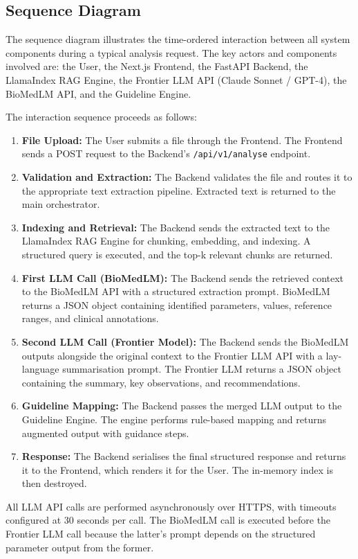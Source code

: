 \subsection{Sequence Diagram}
The sequence diagram illustrates the time-ordered interaction between all system components during a typical analysis request. The key actors and components involved are: the User, the Next.js Frontend, the FastAPI Backend, the LlamaIndex RAG Engine, the Frontier LLM API (Claude Sonnet / GPT-4), the BioMedLM API, and the Guideline Engine.

The interaction sequence proceeds as follows:

\begin{enumerate}
    \item \textbf{File Upload:} The User submits a file through the Frontend. The Frontend sends a POST request to the Backend's \texttt{/api/v1/analyse} endpoint.
    \item \textbf{Validation and Extraction:} The Backend validates the file and routes it to the appropriate text extraction pipeline. Extracted text is returned to the main orchestrator.
    \item \textbf{Indexing and Retrieval:} The Backend sends the extracted text to the LlamaIndex RAG Engine for chunking, embedding, and indexing. A structured query is executed, and the top-k relevant chunks are returned.
    \item \textbf{First LLM Call (BioMedLM):} The Backend sends the retrieved context to the BioMedLM API with a structured extraction prompt. BioMedLM returns a JSON object containing identified parameters, values, reference ranges, and clinical annotations.
    \item \textbf{Second LLM Call (Frontier Model):} The Backend sends the BioMedLM outputs alongside the original context to the Frontier LLM API with a lay-language summarisation prompt. The Frontier LLM returns a JSON object containing the summary, key observations, and recommendations.
    \item \textbf{Guideline Mapping:} The Backend passes the merged LLM output to the Guideline Engine. The engine performs rule-based mapping and returns augmented output with guidance steps.
    \item \textbf{Response:} The Backend serialises the final structured response and returns it to the Frontend, which renders it for the User. The in-memory index is then destroyed.
\end{enumerate}

All LLM API calls are performed asynchronously over HTTPS, with timeouts configured at 30 seconds per call. The BioMedLM call is executed before the Frontier LLM call because the latter's prompt depends on the structured parameter output from the former.

